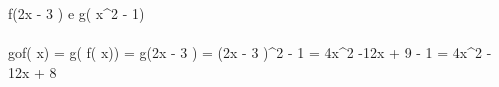  \\ \\

f\left(2x - 3 \right) e g\left( x^{2} - 1\right) \\ \\

gof\left( x\right) = g\left( f\left( x\right)\right) = g\left(2x - 3 \right) = \left(2x - 3 \right)^{2} - 1 = 4x^{2} -12x + 9 - 1 = 4x^{2} - 12x + 8 
